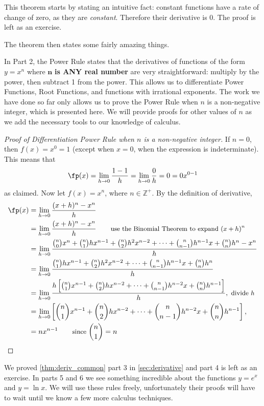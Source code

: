 This theorem starts by stating an intuitive fact: constant functions have a rate of change of zero, as they are \emph{constant}. Therefore their derivative is 0. The proof is left as an exercise.

The theorem then states some fairly amazing things.

In Part 2, the Power Rule states that the derivatives of functions of the form $y=x^n$ where $\mathbf{n}$ \textbf{is ANY real number} are very straightforward: multiply by the power, then subtract 1 from the power. This allows us to differentiate Power Functions, Root Functions, and functions with irrational exponents. The work we have done so far only allows us to prove the Power Rule when $n$ is a non-negative integer, which is presented here. We will provide proofs for other values of $n$ as we add the necessary tools to our knowledge of calculus.

\begin{proof}[Proof of Differentiation Power Rule when $n$ is a non-negative integer]
If $n=0$, then $f(x)=x^0=1$ (except when $x=0$, when the expression is indeterminate).  This means that
\[\fp(x)=\lim_{h\to0}\frac{1-1}h=\lim_{h\to0}\frac0h=0=0x^{0-1}\]
as claimed.  Now let $f(x)= x^n$, where $n \in \mathbb{Z}^+$. By the definition of derivative,
\begin{align*}
\fp(x)
&= \lim_{h\to 0} \dfrac{(x+h)^n - x^n}{h} \\
&= \lim_{h\to 0} \dfrac{(x+h)^n - x^n}{h} \qquad\text{\small use the Binomial Theorem to expand $(x+h)^n$} \\
&=\lim_{h\to 0} \dfrac{\binom{n}{0}x^n + \binom{n}{1} hx^{n-1} + \binom{n}{2} h^2x^{n-2}+ \dotsb +\binom{n}{n-1} h^{n-1}x + \binom {n}{n} h^n  -x^n}{h} \\
&= \lim_{h\to 0} \dfrac{\binom{n}{1} hx^{n-1} + \binom{n}{2} h^2x^{n-2}+ \dotsb +\binom{n}{n-1} h^{n-1}x + \binom{n}{n} h^n}{h} \\
&= \lim_{h\to 0} \dfrac{h\left[\binom{n}{1} x^{n-1} + \binom{n}{2} h x^{n-2}+ \dotsb +\binom{n}{n-1} h^{n-2}x + \binom {n}{n} h^{n-1}\right]}{h},\text{\small~divide $h$}\\
&= \lim_{h\to 0}\left[\dbinom{n}{1} x^{n-1} + \dbinom{n}{2} h x^{n-2}+ \dotsb +\dbinom{n}{n-1} h^{n-2}x + \dbinom {n}{n} h^{n-1}\right],\\
&=  n x^{n-1} \qquad\text{\small since } \dbinom{n}{1} = n \qedhere
\end{align*}
\end{proof}

We proved \autoref{thm:deriv_common} part 3 in \autoref{sec:derivative} and part 4 is left as an exercise.  In parts 5 and 6 we see something incredible about the functions $y=e^x$ and $y=\ln x$. We will use these rules freely, unfortunately their proofs will have to wait until we know a few more calculus techniques.

